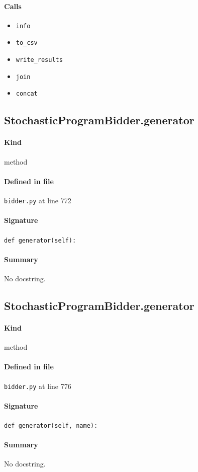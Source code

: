 \documentclass[11pt]{report}
\begin{document}
\paragraph{Calls}
\begin{itemize}[leftmargin=*]
  \item \texttt{info}
  \item \texttt{to\_csv}
  \item \texttt{write\_results}
  \item \texttt{join}
  \item \texttt{concat}
\end{itemize}
\subsection{StochasticProgramBidder.generator}
\label{def:bidder.py:StochasticProgramBidder.generator:L772}
\paragraph{Kind} method
\paragraph{Defined in file} \texttt{bidder.py} at line 772
\paragraph{Signature} \texttt{def generator(self):}
\paragraph{Summary} No docstring.
\subsection{StochasticProgramBidder.generator}
\label{def:bidder.py:StochasticProgramBidder.generator:L776}
\paragraph{Kind} method
\paragraph{Defined in file} \texttt{bidder.py} at line 776
\paragraph{Signature} \texttt{def generator(self, name):}
\paragraph{Summary} No docstring.
\end{document}
